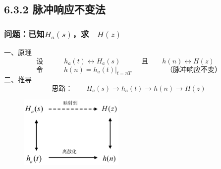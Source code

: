 \documentclass[notheorems,compress,mathserif,table]{beamer}
\begin{document}


\subsection{6.3.2 脉冲响应不变法}
\begin{frame}[shrink]\frametitle{问题：已知$H_a(s)$，求$\quad H(z)$}%

一、原理
  $$\mbox{设}\quad\quad\quad
  h_a(t) \longleftrightarrow H_a(s)\quad\quad\quad
   \mbox{且}\quad\quad h(n) \longleftrightarrow H(z)\quad$$
  $$\mbox{令}\quad\quad\quad h(n)=h_a(t)|_{t=nT}\quad\quad\quad
  \quad\quad\mbox{（脉冲响应不变）}$$
  二、推导
$$\mbox{思路：}\quad\quad H_a(s)\longrightarrow h_a(t) \longrightarrow h(n) \longrightarrow H(z)$$
  \begin{figure}[h]
    \centering
    \includegraphics[width=0.45\textwidth]{fig12_maichongxiangying.jpg}
  \end{figure}
\end{frame}
\end{document}

